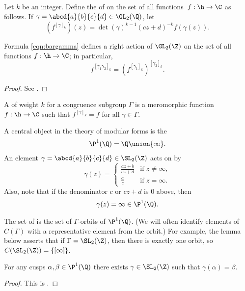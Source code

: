 Let $k$ be an integer.
Define the  
of  on 
the set of all functions~$f:\h\to\C$  as follows.  
If $\gamma=\abcd{a}{b}{c}{d}\in\GL_2(\Q)$, let
\begin{equation}\label{eqn:bargamma}
  (f^{[\gamma]_k})(z) = \det(\gamma)^{k-1} (cz+d)^{-k} f(\gamma(z)).
\end{equation}
\begin{proposition}
Formula \eqref{eqn:bargamma} defines a right action
of $\GL_2(\Z)$ on the set of all functions $f:\h\to\C$; in
particular, 
$$
  f^{[\gamma_1\gamma_2]_k} = (f^{[\gamma_1]_k})^{[\gamma_2]_k}.
$$
\end{proposition}
\begin{proof}
See .
\end{proof}

\begin{definition}
A  of weight $k$ for a
congruence subgroup $\Gamma$ is a meromorphic
function $f :\h \to \C$ such that 
$f^{[\gamma]_k} = f$ for all $\gamma \in \Gamma$.
\end{definition}

A central object in the theory of modular forms 
is the 
$$
  \P^1(\Q) = \Q \union \{\infty\}.
$$
An element $\gamma=\abcd{a}{b}{c}{d} \in \SL_2(\Z)$ 
acts on  by 
$$
  \gamma(z) = \begin{cases} 
         \frac{az+b}{cz+d} & \text{if $z\neq \infty$},\\
         \frac{a}{c} & \text{if $z=\infty$.}
       \end{cases}
$$
Also, note that if the denominator $c$ or $cz+d$ is $0$ above, 
then $$\gamma(z)=\infty \in \P^1(\Q).$$

The set of  is the set
 of $\Gamma$-orbits of $\P^1(\Q)$.  (We
will often identify elements of $C(\Gamma)$ with a representative
element from the orbit.)  For example, the lemma below
asserts that if $\Gamma=\SL_2(\Z)$, then there is
exactly one orbit, so $C(\SL_2(\Z)) = \{[\infty]\}$.
\begin{lemma}\label{lem:sl2ztrans}
  For any cusps $\alpha, \beta\in\P^1(\Q)$ there exists
  $\gamma\in\SL_2(\Z)$ such that $\gamma(\alpha) = \beta$.
\end{lemma}
\begin{proof}
This is .
\end{proof}

